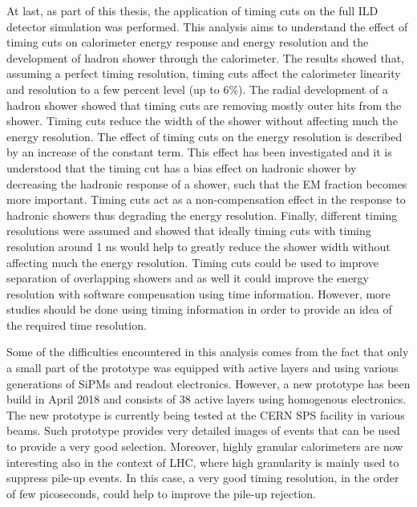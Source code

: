 At last, as part of this thesis, the application of timing cuts on the full ILD detector simulation was performed. This analysis aims to understand the effect of timing cuts on calorimeter energy response and energy resolution and the development of hadron shower through the calorimeter. The results showed that, assuming a perfect timing resolution, timing cuts affect the calorimeter linearity and resolution to a few percent level (up to 6\%). The radial development of a hadron shower showed that timing cuts are removing mostly outer hits from the shower. Timing cuts reduce the width of the shower without affecting much the energy resolution. The effect of timing cuts on the energy resolution is described by an increase of the constant term. This effect has been investigated and it is understood that the timing cut has a bias effect on hadronic shower by decreasing the hadronic response of a shower, such that the EM fraction becomes more important. Timing cuts act as a non-compensation effect in the response to hadronic showers thus degrading the energy resolution. Finally, different timing resolutions were assumed and showed that ideally timing cuts with timing resolution around 1 ns would help to greatly reduce the shower width without affecting much the energy resolution. Timing cuts could be used to improve separation of overlapping showers and as well it could improve the energy resolution with software compensation using time information. However, more studies should be done using timing information in order to provide an idea of the required time resolution.

Some of the difficulties encountered in this analysis comes from the fact that only a small part of the prototype was equipped with active layers and using various generations of SiPMs and readout electronics. However, a new prototype has been build in April 2018 and consists of 38 active layers using homogenous electronics. The new prototype is currently being tested at the CERN SPS facility in various beams. Such prototype provides very detailed images of events that can be used to provide a very good selection. Moreover, highly granular calorimeters are now interesting also in the context of LHC, where high granularity is mainly used to suppress pile-up events. In this case, a very good timing resolution, in the order of few picoseconds, could help to improve the pile-up rejection.
